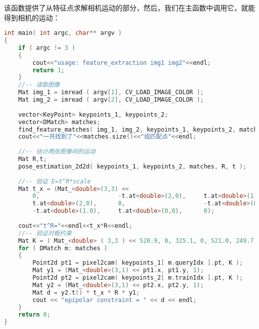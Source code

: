 该函数提供了从特征点求解相机运动的部分，然后，我们在主函数中调用它，就能得到相机的运动：
\begin{lstlisting}[language=c++,caption=slambook/ch7/pose_estimation_2d2d.cpp （片段）]
int main( int argc, char** argv )
{
	if ( argc != 3 )
	{
		cout<<"usage: feature_extraction img1 img2"<<endl;
		return 1;
	}
	//-- 读取图像
	Mat img_1 = imread ( argv[1], CV_LOAD_IMAGE_COLOR );
	Mat img_2 = imread ( argv[2], CV_LOAD_IMAGE_COLOR );
	
	vector<KeyPoint> keypoints_1, keypoints_2;
	vector<DMatch> matches;
	find_feature_matches( img_1, img_2, keypoints_1, keypoints_2, matches );
	cout<<"一共找到了"<<matches.size()<<"组匹配点"<<endl;
	
	//-- 估计两张图像间的运动
	Mat R,t;
	pose_estimation_2d2d( keypoints_1, keypoints_2, matches, R, t );
	
	//-- 验证 E=t^R*scale
	Mat t_x = (Mat_<double>(3,3) << 
		0,                      -t.at<double>(2,0),     t.at<double>(1,0), 
		t.at<double>(2,0),      0,                      -t.at<double>(0,0),
		-t.at<double>(1.0),     t.at<double>(0,0),      0);
	
	cout<<"t^R="<<endl<<t_x*R<<endl;
	//-- 验证对极约束
	Mat K = ( Mat_<double> ( 3,3 ) << 520.9, 0, 325.1, 0, 521.0, 249.7, 0, 0, 1 );
	for ( DMatch m: matches )
	{
		Point2d pt1 = pixel2cam( keypoints_1[ m.queryIdx ].pt, K );
		Mat y1 = (Mat_<double>(3,1) << pt1.x, pt1.y, 1);
		Point2d pt2 = pixel2cam( keypoints_2[ m.trainIdx ].pt, K );
		Mat y2 = (Mat_<double>(3,1) << pt2.x, pt2.y, 1);
		Mat d = y2.t() * t_x * R * y1;
		cout << "epipolar constraint = " << d << endl;
	}
	return 0;
}
\end{lstlisting}

